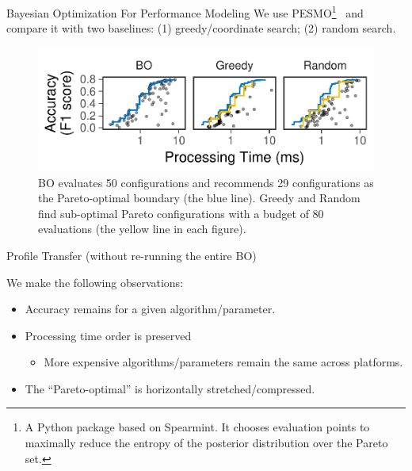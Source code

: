 \begin{frame}{Bayesian Optimization For Performance Modeling}
  \vspace{1em} We use PESMO\footnote{A Python package based on Spearmint. It
    chooses evaluation points to maximally reduce the entropy of the posterior
    distribution over the Pareto set.}~\cite{hernandez2016predictive} and
  compare it with two baselines: (1) greedy/coordinate search; (2) random
  search.

  \pause
  \begin{figure}
    \centering
    \includegraphics[width=0.95\linewidth]{figures/serving-eval-bo.pdf}
    \caption{BO evaluates 50 configurations and recommends 29 configurations as
      the Pareto-optimal boundary (the blue line). Greedy and Random find
      sub-optimal Pareto configurations with a budget of 80 evaluations (the
      yellow line in each figure).}
  \end{figure}
\end{frame}

\begin{frame}{Profile Transfer (without re-running the entire BO)}
  \vspace{1em}

  We make the following observations:

  \begin{itemize}
  \item Accuracy remains for a given algorithm/parameter.
  \item Processing time order is preserved
    \begin{itemize}
    \item More expensive algorithms/parameters remain the same across platforms.
    \end{itemize}
  \item The ``Pareto-optimal'' is horizontally stretched/compressed.
  \end{itemize}

\end{frame}

